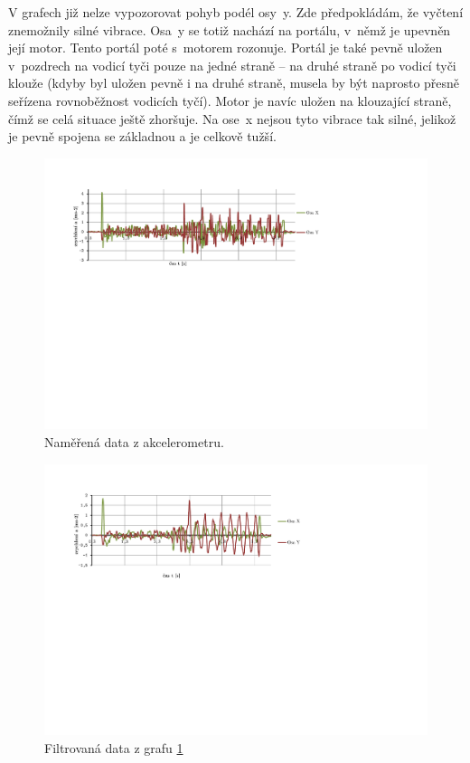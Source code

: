 	V grafech již nelze vypozorovat pohyb podél osy~y. Zde předpokládám, že vyčtení znemožnily silné vibrace. Osa~y se totiž nachází na portálu, v~němž je upevněn její motor. Tento portál poté s~motorem rozonuje. Portál je také pevně uložen v~pozdrech na vodicí tyči pouze na jedné straně -- na druhé straně po vodicí tyči klouže (kdyby byl uložen pevně i na druhé straně, musela by být naprosto přesně seřízena rovnoběžnost vodicích tyčí). Motor je navíc uložen na klouzající straně, čímž se celá situace ještě zhoršuje. Na ose~x nejsou tyto vibrace tak silné, jelikož je pevně spojena se základnou a je celkově tužší.

	
	\begin{figure}[h!]	
		\centering
		\includegraphics[width=\textwidth]{img/nefiltrovane.pdf}
		\caption{Naměřená data z akcelerometru.}\label{graf:nefiltr}	
	\end{figure}
	
	\begin{figure}[h!]	
		\centering
		\includegraphics[width=\textwidth]{img/filtrovane.pdf}
		\caption{Filtrovaná data z grafu \ref{graf:nefiltr}}\label{graf:filtr}	
	\end{figure}
	
